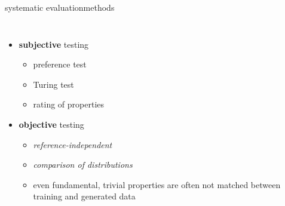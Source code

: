 \begin{frame}{systematic evaluation}{methods}
    \vspace{-5mm}
    
    \begin{columns}
    \begin{itemize}
 
        \item<1->   \textbf{subjective} testing
            \begin{itemize}
                \item<2->   preference test
                \item<2->   Turing test
                \item<2->   rating of properties
            \end{itemize}
        \bigskip
        \item<3->   \textbf{objective} testing
            \begin{itemize}
                \item   \textit{reference-independent} 
                \item   \textit{comparison of distributions}
                \bigskip
                \item<4->[$\Rightarrow$] even fundamental, trivial properties are often not matched between training and generated data
            \end{itemize}
    \end{itemize}
    \end{columns}
\end{frame}


